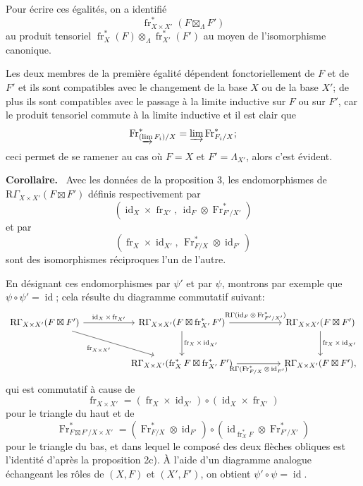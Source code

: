 \documentclass[11pt]{article}
\newenvironment{statement}[1]{\par\medskip\noindent\textbf{#1.}\ }{\par\medskip}
\providecommand{\RGamma}{\mathrm R\Gamma}
\providecommand{\id}{\operatorname{id}}
\providecommand{\id}{\operatorname{id}}
\providecommand{\id}{\operatorname{id}}
\providecommand{\RGamma}{\mathrm R\Gamma}
\providecommand{\id}{\operatorname{id}}
\providecommand{\id}{\operatorname{id}}
\providecommand{\fr}{\operatorname{fr}}
\providecommand{\Fr}{\operatorname{Fr}}
\providecommand{\Fr}{\operatorname{Fr}}
\providecommand{\fr}{\operatorname{fr}}
\providecommand{\id}{\operatorname{id}}
\providecommand{\RGamma}{\mathrm R\Gamma}
\providecommand{\boxt}{\boxtimes}
\begin{document}
Pour écrire ces égalités, on a identifié
\[
\fr_{X\times X'}^*(F\boxt_\Lambda F')
\]
au produit tensoriel $\fr_X^*(F)\otimes_\Lambda\fr_{X'}^*(F')$ au moyen de l'isomorphisme canonique.

Les deux membres de la première égalité dépendent fonctoriellement de $F$ et de $F'$ et ils sont compatibles avec le changement de la base $X$ ou de la base $X'$; de plus ils sont compatibles avec le passage à la limite inductive sur $F$ ou sur $F'$, car le produit tensoriel commute à la limite inductive et il est clair que
\[
\Fr^*_{(\varinjlim F_i)/X}=\varinjlim\Fr^*_{F_i/X};
\]
ceci permet de se ramener au cas où $F=X$ et $F'=\Lambda_{X'}$, alors c'est évident.

\begin{statement}{Corollaire}
Avec les données de la proposition 3, les endomorphismes de $\RGamma_{X\times X'}(F\boxt F')$ définis respectivement par
\[
(\id_X\times\fr_{X'},\,\id_F\otimes\Fr^*_{F'/X'})
\]
et par
\[
(\fr_X\times\id_{X'},\,\Fr^*_{F/X}\otimes\id_{F'})
\]
sont des isomorphismes réciproques l'un de l'autre.
\end{statement}

En désignant ces endomorphismes par $\psi'$ et par $\psi$, montrons par exemple que $\psi\circ\psi'=\id$; cela résulte du diagramme commutatif suivant:
\[
\begin{tikzcd}[column sep=huge,row sep=large]
\RGamma_{X\times X'}(F\boxt F')
  \arrow[r,"\id_X\times\fr_{X'}"] \arrow[dr,"\fr_{X\times X'}"']
& \RGamma_{X\times X'}(F\boxt\fr_{X'}^*F')
  \arrow[r,"\RGamma(\id_F\otimes\Fr^*_{F'/X'})"] \arrow[d,"\fr_X\times\id_{X'}"]
& \RGamma_{X\times X'}(F\boxt F') \arrow[d,"\fr_X\times\id_{X'}"]\\
& \RGamma_{X\times X'}(\fr_X^*F\boxt\fr_{X'}^*F')
  \arrow[r,"\RGamma(\Fr^*_{F/X}\otimes\id_{F'})"']
& \RGamma_{X\times X'}(F\boxt F') ,
\end{tikzcd}
\]
qui est commutatif à cause de
\[
\fr_{X\times X'}=(\fr_X\times\id_{X'})\circ(\id_X\times\fr_{X'})
\]
pour le triangle du haut et de
\[
\Fr^*_{F\boxt F'/X\times X'}=(\Fr^*_{F/X}\otimes\id_{F'})\circ(\id_{\fr_X^*F}\otimes\Fr^*_{F'/X'})
\]
pour le triangle du bas, et dans lequel le composé des deux flèches obliques est l'identité d'après la proposition 2c). À l'aide d'un diagramme analogue échangeant les rôles de $(X,F)$ et $(X',F')$, on obtient $\psi'\circ\psi=\id$.
\end{document}
